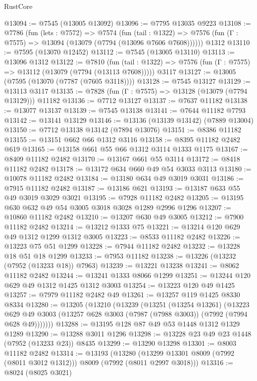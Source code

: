 \begin{lexlean}{RustCore}
\begin{coremodule}
@13094 := @7545 (@13005 @13092)
@13096 := @7795 @13035 @9223
@13108 := @7786
    (fun (lets : @7572) =>
    @7574
      (fun (tail : @1322) =>
      @7576 (fun (Γ : @7575) => @13094 (@13079 (@7794 (@13096 @7606 @7608))))))
    @1312
@13110 := @7595 (@13070 @12452)
@13112 := @7545 (@13005 @13110)
@13113 := @13096 @1312
@13122 := @7810
    (fun (tail : @1322) => @7576 (fun (Γ : @7575) => @13112 (@13079 (@7794 (@13113 @7608)))))
    @3117
@13127 := @13005 (@7595 (@13070 (@7787 (@7605 @3118))))
@13128 := @7545 @13127
@13129 := @13113 @3117
@13135 := @7828 (fun (Γ : @7575) => @13128 (@13079 (@7794 @13129))) @11182
@13136 := @7712 @13127
@13137 := @7637 @11182
@13138 := @13077 @13137
@13139 := @7545 @13138
@13141 := @7644 @11182 @7793
@13142 := @13141 @13129
@13146 := @13136 (@13139 @13142) (@7889 @13004)
@13150 := @7712 @13138 @13142 (@7894 @13076)
@13151 := @8386 @11182
@13155 := @13151 @662 @66 @1312 @3116
@13158 := @8395 @11182 @2482 @619
@13165 := @13158 @661 @55 @66 @1312 @3114 @1333 @1175
@13167 := @8409 @11182 @2482
@13170 := @13167 @661 @55 @3114
@13172 := @8418 @11182 @2482
@13178 := @13172 @634 @660 @49 @54 @3033 @3113
@13180 := @10078 @11182 @2482
@13184 := @13180 @634 @49 @3019 @3031
@13186 := @7915 @11182 @2482
@13187 := @13186 @621
@13193 := @13187 @633 @55 @49 @3019 @3029 @3021
@13195 := @7928 @11182 @2482
@13205 := @13195 @630 @632 @49 @54 @3005 @3018 @3028 @1289 @2996 @1296
@13207 := @10860 @11182 @2482
@13210 := @13207 @630 @49 @3005
@13212 := @7900 @11182 @2482
@13214 := @13212 @1333 @75
@13221 := @13214 @120 @629 @49 @1312 @1299 @1312 @3005
@13223 := @8533 @11182 @2482
@13226 := @13223 @75 @51 @1299
@13228 := @7944 @11182 @2482
@13232 := @13228 @18 @51 @18 @1299
@13233 := @7953 @11182
@13238 := @13226 (@13232 (@7952 (@13233 @18)) @7963)
@13239 := @13221 @13238
@13241 := @8062 @11182 @2482
@13244 := @13241 @1333 @8066 @1299
@13251 := @13244 @120 @629 @49 @1312 @1425 @1312 @3003
@13254 := @13223 @120 @49 @1425
@13257 := @7979 @11182 @2482 @49
@13261 := @13257 @119 @1425 @8330 @8334
@13280 := @13205
    (@13210
      (@13239
        (@13251
          (@13254 @13261)
          (@13223
            @629
            @49
            @3003
            (@13257 @628 @3003 (@7987 (@7988 @3003)) (@7992 (@7994 @628 @49)))))))
@13288 := @13195 @128 @87 @49 @53 @1448 @1312 @1329 @1289
@13290 := @13288 @3011 @1296
@13298 := @13228 @23 @49 @23 @1448 (@7952 (@13233 @23)) @8435
@13299 := @13290 @13298
@13301 := @8003 @11182 @2482
@13314 := @13193
    (@13280 (@13299 @13301 @8009 (@7992 (@8011 @3012 @1312))) @8009 (@7992 (@8011 @2997 @3018)))
@13316 := @8024 (@8025 @3021)

\end{coremodule}
\end{lexlean}
